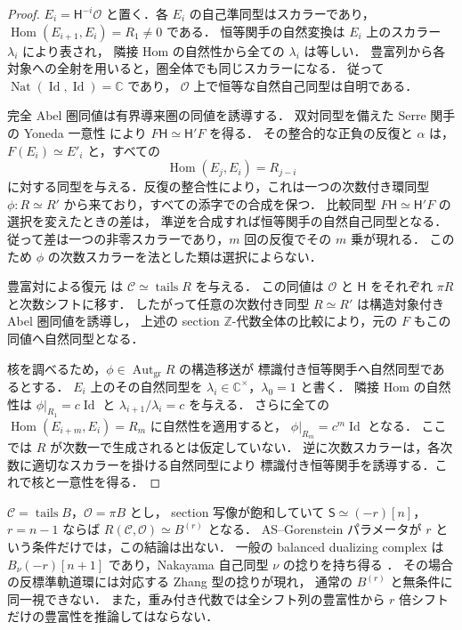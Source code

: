 \begin{proof}
$E_i=\mathsf H^{-i}\mathcal O$ と置く．各 $E_i$ の自己準同型はスカラーであり，
$\operatorname{Hom}(E_{i+1},E_i)=R_1\ne0$ である．
恒等関手の自然変換は $E_i$ 上のスカラー $\lambda_i$ により表され，
隣接 Hom の自然性から全ての $\lambda_i$ は等しい．
豊富列から各対象への全射を用いると，圏全体でも同じスカラーになる．
従って $\operatorname{Nat}(\operatorname{Id},\operatorname{Id})=\mathbb C$ であり，
$\mathcal O$ 上で恒等な自然自己同型は自明である．

完全 Abel 圏同値は有界導来圏の同値を誘導する．
双対同型を備えた Serre 関手の Yoneda 一意性
\cite[Lemma 57.3.5, Tag 0FY3]{StacksProject} により
$F\mathsf H\simeq\mathsf H'F$ を得る．
その整合的な正負の反復と $\alpha$ は，
$F(E_i)\simeq E'_i$ と，すべての
\[
 \operatorname{Hom}(E_j,E_i)=R_{j-i}
\]
に対する同型を与える．反復の整合性により，これは一つの次数付き環同型
$\phi:R\simeq R'$ から来ており，すべての添字での合成を保つ．
比較同型 $F\mathsf H\simeq\mathsf H'F$ の選択を変えたときの差は，
準逆を合成すれば恒等関手の自然自己同型となる．
従って差は一つの非零スカラーであり，$m$ 回の反復でその $m$ 乗が現れる．
このため $\phi$ の次数スカラーを法とした類は選択によらない．

豊富対による復元
\cite[Theorem 2.6(2)]{MoriUeyama2021} は
$\mathcal C\simeq\operatorname{tails}R$ を与える．
この同値は $\mathcal O$ と $\mathsf H$ をそれぞれ
$\pi R$ と次数シフトに移す．
したがって任意の次数付き同型 $R\simeq R'$ は構造対象付き Abel 圏同値を誘導し，
上述の section $\mathbb Z$-代数全体の比較により，元の $F$ もこの同値へ自然同型となる．

核を調べるため，$\phi\in\operatorname{Aut}_{\mathrm{gr}}R$ の構造移送が
標識付き恒等関手へ自然同型であるとする．
$E_i$ 上のその自然同型を $\lambda_i\in\mathbb C^\times$，$\lambda_0=1$ と書く．
隣接 Hom の自然性は $\phi|_{R_1}=c\operatorname{Id}$ と
$\lambda_{i+1}/\lambda_i=c$ を与える．
さらに全ての $\operatorname{Hom}(E_{i+m},E_i)=R_m$ に自然性を適用すると，
$\phi|_{R_m}=c^m\operatorname{Id}$ となる．
ここでは $R$ が次数一で生成されるとは仮定していない．
逆に次数スカラーは，各次数に適切なスカラーを掛ける自然同型により
標識付き恒等関手を誘導する．これで核と一意性を得る．
\end{proof}

\begin{remark}
\label{rem:ncdp-serre-twist}
$\mathcal C=\operatorname{tails}B$，$\mathcal O=\pi B$ とし，
section 写像が飽和していて
$\mathsf S\simeq(-r)[n]$，$r=n-1$ ならば
$R(\mathcal C,\mathcal O)\simeq B^{(r)}$ となる．
AS--Gorenstein パラメータが $r$ という条件だけでは，この結論は出ない．
一般の balanced dualizing complex は
$B_\nu(-r)[n+1]$ であり，Nakayama 自己同型 $\nu$ の捻りを持ち得る
\cite[\S1.2, after Definition 1.3]{MoriUeyama2021}．
その場合の反標準軌道環には対応する Zhang 型の捻りが現れ，
通常の $B^{(r)}$ と無条件に同一視できない．
また，重み付き代数では全シフト列の豊富性から
$r$ 倍シフトだけの豊富性を推論してはならない．
\end{remark}

